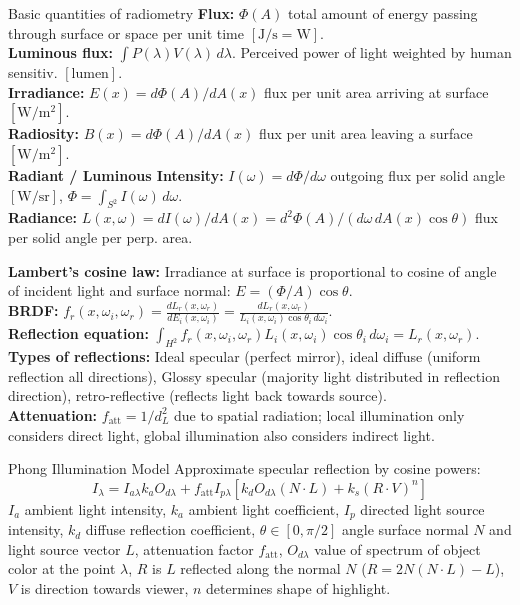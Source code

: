 \documentclass[a4paper,9pt]{article}
\begin{document}
\begin{subbox}{Basic quantities of radiometry}
\textbf{Flux:} $\Phi(A)$ total amount of energy passing through surface or space per unit time $[\text{J}/\text{s} = \text{W}]$.\\
\textbf{Luminous flux:} $\int P(\lambda) V(\lambda)\, d\lambda$. Perceived power of light weighted by human sensitiv. $[\text{lumen}]$.\\
\textbf{Irradiance:} $E(x) = d\Phi(A)/dA(x)$ flux per unit area arriving at surface $[\text{W}/\text{m}^2]$.\\
\textbf{Radiosity:} $B(x) = d\Phi(A)/dA(x)$ flux per unit area leaving a surface $[\text{W}/\text{m}^2]$.\\
\textbf{Radiant / Luminous Intensity:} $I(\omega) = d\Phi / d\omega$ outgoing flux per solid angle $[\text{W}/\text{sr}]$, $\Phi = \int_{S^2} I(\omega)\, d\omega$.\\
\textbf{Radiance:} $L(x, \omega) = dI(\omega)/dA(x) = d^2\Phi(A)/(d\omega\, dA(x) \cos\theta)$ flux per solid angle per perp. area.
\end{subbox}

\textbf{Lambert's cosine law:} Irradiance at surface is proportional to cosine of angle of incident light and surface normal: $E = (\Phi / A) \cos \theta$.\\
\textbf{BRDF:} $f_r(x, \omega_i, \omega_r) = \frac{dL_r(x, \omega_r)}{dE_i(x, \omega_i)} = \frac{dL_r(x, \omega_r)}{L_i(x, \omega_i) \cos\theta_i \, d\omega_i}$.\\
\textbf{Reflection equation:} $\int_{H^2} f_r(x, \omega_i, \omega_r) L_i(x, \omega_i) \cos\theta_i \, d\omega_i = L_r(x, \omega_r)$.\\
\textbf{Types of reflections:} Ideal specular (perfect mirror), ideal diffuse (uniform reflection all directions), Glossy specular (majority light distributed in reflection direction), retro-reflective (reflects light back towards source).\\
\textbf{Attenuation:} $f_{\text{att}} = 1 / d_L^2$ due to spatial radiation; local illumination only considers direct light, global illumination also considers indirect light.

\begin{subbox}{Phong Illumination Model}
Approximate specular reflection by cosine powers:
$$ I_\lambda = I_{a\lambda} k_a O_{d\lambda} + f_{\text{att}} I_{p\lambda} \left[k_d O_{d\lambda}(N \cdot L) + k_s (R \cdot V)^n\right] $$
$I_a$ ambient light intensity, $k_a$ ambient light coefficient, $I_p$ directed light source intensity, $k_d$ diffuse reflection coefficient, $\theta \in [0, \pi/2]$ angle surface normal $N$ and light source vector $L$, attenuation factor $f_{\text{att}}$, $O_{d\lambda}$ value of spectrum of object color at the point $\lambda$, $R$ is $L$ reflected along the normal $N$ ($R = 2N(N \cdot L) - L$), $V$ is direction towards viewer, $n$ determines shape of highlight.
\end{subbox}
\end{document}
